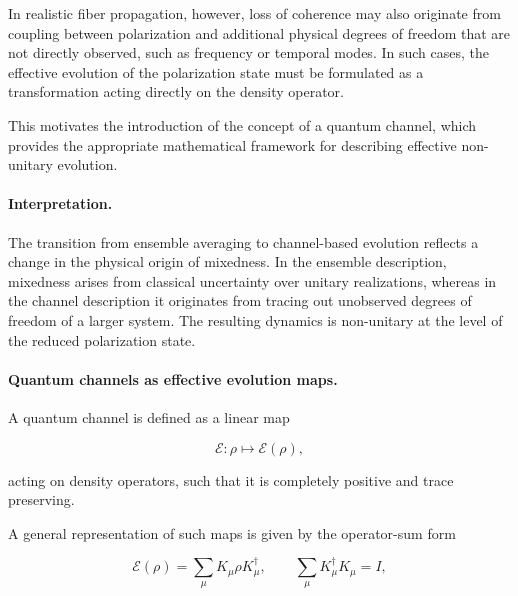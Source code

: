 \medskip

In realistic fiber propagation, however, loss of coherence may also originate from coupling between polarization and additional physical degrees of freedom that are not directly observed, such as frequency or temporal modes. In such cases, the effective evolution of the polarization state must be formulated as a transformation acting directly on the density operator.

\medskip

This motivates the introduction of the concept of a quantum channel, which provides the appropriate mathematical framework for describing effective non-unitary evolution.

\medskip

\paragraph{Interpretation.}

The transition from ensemble averaging to channel-based evolution reflects a change in the physical origin of mixedness. In the ensemble description, mixedness arises from classical uncertainty over unitary realizations, whereas in the channel description it originates from tracing out unobserved degrees of freedom of a larger system. The resulting dynamics is non-unitary at the level of the reduced polarization state.

\medskip

\paragraph{Quantum channels as effective evolution maps.}

A quantum channel is defined as a linear map

\begin{equation}
\mathcal{E}:\rho \mapsto \mathcal{E}(\rho),
\label{eq:quantum_channel_map}
\end{equation}

acting on density operators, such that it is completely positive and trace preserving.

A general representation of such maps is given by the operator-sum form

\begin{equation}
\mathcal{E}(\rho)
=
\sum_{\mu}
K_{\mu}
\rho
K_{\mu}^{\dagger},
\qquad
\sum_{\mu}
K_{\mu}^{\dagger}K_{\mu}
=
I,
\label{eq:kraus_operator_sum}
\end{equation}

